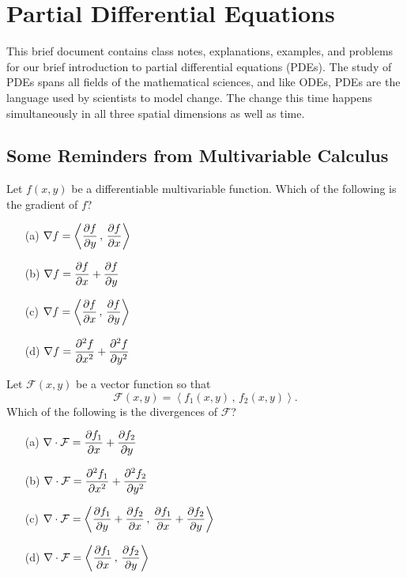 \chapter{Partial Differential Equations}\label{ch:PDEs}

This brief document contains class notes, explanations, examples, and problems for our
brief introduction to partial differential equations (PDEs).  The study of PDEs spans all
fields of the mathematical sciences, and like ODEs, PDEs are the language used by
scientists to model change.  The change this time happens simultaneously in all three
spatial dimensions as well as time.


\section{Some Reminders from Multivariable Calculus}
\begin{problem}
    Let $f(x,y)$ be a differentiable multivariable function.  Which of the following is
    the gradient of $f$?
    \begin{itemize}
        \item[(a)] $\displaystyle \nabla f = \left< \frac{\partial{f}}{\partial{y}} \, , \, \frac{\partial{f}}{\partial{x}} \right>$
        \item[(b)] $\displaystyle \nabla f = \frac{\partial{f}}{\partial{x}} + \frac{\partial{f}}{\partial{y}}$
        \item[(c)] $\displaystyle \nabla f = \left< \frac{\partial{f}}{\partial{x}} \, , \, \frac{\partial{f}}{\partial{y}} \right>$
        \item[(d)] $\displaystyle \nabla f = \frac{\partial^2{f}}{\partial{x}^2} + \frac{\partial^2{f}}{\partial{y}^2}$
    \end{itemize}
\end{problem}

\begin{problem}
    Let $\mathcal{F}(x,y)$ be a vector function so that 
    \[ \mathcal{F}(x,y) = \left< f_1(x,y) \, , \, f_2(x,y) \right>. \]
    Which of the following is the divergences of $\mathcal{F}$?
    \begin{itemize}
        \item[(a)] $\displaystyle \nabla \cdot \mathcal{F} = \frac{\partial{f_1}}{\partial{x}} + \frac{\partial{f_2}}{\partial{y}}$
        \item[(b)] $\displaystyle \nabla \cdot \mathcal{F} = \frac{\partial^2{f_1}}{\partial{x}^2} + \frac{\partial^2{f_2}}{\partial{y}^2}$
        \item[(c)] $\displaystyle \nabla \cdot \mathcal{F} = \left< \frac{\partial{f_1}}{\partial{y}} +
            \frac{\partial{f_2}}{\partial{x}} \, , \, \frac{\partial{f_1}}{\partial{x}} + \frac{\partial{f_2}}{\partial{y}} \right>$
        \item[(d)] $\displaystyle \nabla \cdot \mathcal{F} = \left< \frac{\partial{f_1}}{\partial{x}} \, , \,
            \frac{\partial{f_2}}{\partial{y}} \right>$
    \end{itemize}
\end{problem}

